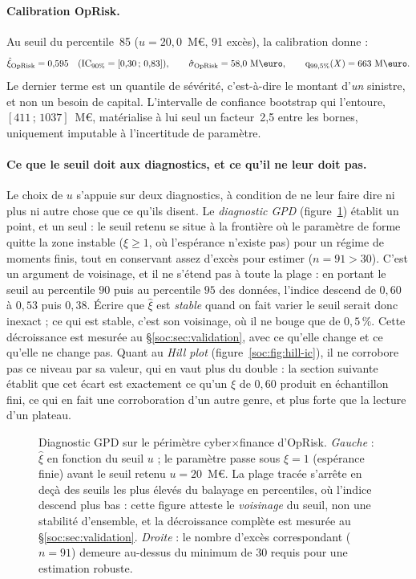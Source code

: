 \paragraph{Calibration OpRisk.} Au seuil du percentile~85
($u = 20{,}0$~M\euro, 91 excès), la calibration donne :
\begin{equation}
\hat{\xi}_{\text{OpRisk}} = 0{,}595 \quad (\text{IC}_{90\%}=[0{,}30\,;\,0{,}83]),
\qquad
\hat{\sigma}_{\text{OpRisk}} = 58{,}0~\text{M\euro},
\qquad
\qsev_{99{,}5\%}(X) = 663~\text{M\euro}.
\end{equation}
Le dernier terme est un quantile de sévérité, c'est-à-dire le montant d'\emph{un}
sinistre, et non un besoin de capital. L'intervalle de confiance bootstrap qui l'entoure,
$[411\,;\,1037]$~M\euro, matérialise à lui seul un facteur~2{,}5 entre les bornes, uniquement
imputable à l'incertitude de paramètre.

\paragraph{Ce que le seuil doit aux diagnostics, et ce qu'il ne leur doit pas.} Le choix de $u$
s'appuie sur deux diagnostics, à condition de ne leur faire dire ni plus ni autre chose que ce
qu'ils disent. Le \emph{diagnostic GPD} (figure~\ref{soc:fig:diagnostic-gpd}) établit un point,
et un seul : le seuil retenu se situe à la frontière où le paramètre de forme quitte la zone
instable ($\xi \geq 1$, où l'espérance n'existe pas) pour un régime de moments finis, tout en
conservant assez d'excès pour estimer ($n = 91 > 30$). C'est un argument de voisinage,
et il ne s'étend pas à toute la plage : en portant le seuil au percentile $90$ puis au percentile
$95$ des données, l'indice descend de $0{,}60$ à $0{,}53$ puis $0{,}38$. Écrire que
$\hat\xi$ est \emph{stable} quand on fait varier le seuil serait donc inexact ; ce qui est
stable, c'est son voisinage, où il ne bouge que de $0{,}5\,\%$. Cette décroissance est mesurée
au \S\ref{soc:sec:validation}, avec ce qu'elle change et ce qu'elle ne change pas. Quant au
\emph{Hill plot} (figure~\ref{soc:fig:hill-ic}), il ne corrobore pas ce niveau par sa valeur,
qui en vaut plus du double : la section suivante établit que cet écart est exactement ce qu'un
$\xi$ de $0{,}60$ produit en échantillon fini, ce qui en fait une corroboration d'un autre
genre, et plus forte que la lecture d'un plateau.

\begin{figure}[htbp]
\centering
{}
\caption{Diagnostic GPD sur le périmètre cyber$\times$finance d'OpRisk.
\textit{Gauche} : $\hat{\xi}$ en fonction du seuil $u$ ; le paramètre passe sous
$\xi = 1$ (espérance finie) avant le seuil retenu $u = 20$~M\euro. La plage tracée
s'arrête en deçà des seuils les plus élevés du balayage en percentiles, où l'indice
descend plus bas : cette figure atteste le \emph{voisinage} du seuil, non une stabilité
d'ensemble, et la décroissance complète est mesurée au \S\ref{soc:sec:validation}.
\textit{Droite} : le nombre d'excès correspondant ($n = 91$) demeure au-dessus du
minimum de $30$ requis pour une estimation robuste.}
\label{soc:fig:diagnostic-gpd}
\end{figure}

